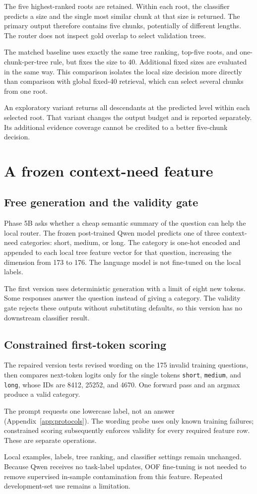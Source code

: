 The five highest-ranked roots are retained. Within each root, the
classifier predicts a size and the single most similar chunk at that
size is returned. The primary output therefore contains five chunks,
potentially of different lengths. The router does not inspect gold
overlap to select validation trees.

The matched baseline uses exactly the same tree ranking, top-five
roots, and one-chunk-per-tree rule, but fixes the size to 40.
Additional fixed sizes are evaluated in the same way. This comparison
isolates the local size decision more directly than comparison with
global fixed-40 retrieval, which can select several chunks from one
root.

An exploratory variant returns all descendants at the predicted level
within each selected root. That variant changes the output budget
and is reported separately. Its additional evidence coverage cannot
be credited to a better five-chunk decision.

\section{A frozen context-need feature}
\subsection{Free generation and the validity gate}
Phase 5B asks whether a cheap semantic summary of the question can
help the local router. The frozen post-trained Qwen model predicts
one of three context-need categories: short, medium, or long. The
category is one-hot encoded and appended to each local tree feature
vector for that question, increasing the dimension from 173 to 176.
The language model is not fine-tuned on the local labels.

The first version uses deterministic generation with a limit of eight
new tokens. Some responses answer the question instead of giving a
category. The validity gate rejects these outputs without substituting
defaults, so this version has no downstream classifier result.

\subsection{Constrained first-token scoring}
The repaired version tests revised wording on the 175 invalid training
questions, then compares next-token logits only for the single tokens
\texttt{short}, \texttt{medium}, and \texttt{long}, whose IDs are 8412,
25252, and 4670. One forward pass and an argmax produce a valid category.

The prompt requests one lowercase label, not an answer
(Appendix~\ref{app:protocols}). The wording probe uses only known
training failures; constrained scoring subsequently enforces validity
for every required feature row. These are separate operations.

Local examples, labels, tree ranking, and classifier settings remain
unchanged. Because Qwen receives no task-label updates, OOF fine-tuning
is not needed to remove supervised in-sample contamination from this
feature. Repeated development-set use remains a limitation.
